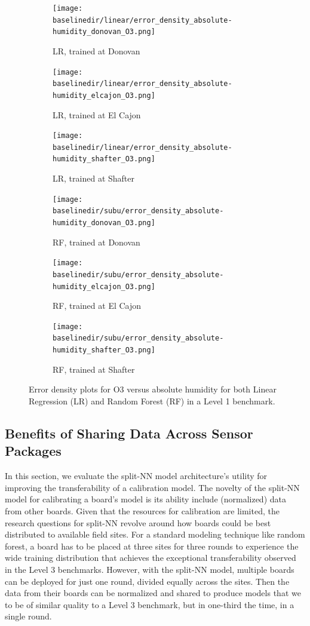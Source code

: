\documentclass[journal abbreviation, manuscript]{copernicus}
\begin{document}
\begin{figure}[H]
\centering
\begin{subfigure}{0.33\textwidth}
\texttt{[image: \\baselinedir/linear/error\_density\_absolute-humidity\_donovan\_O3.png]}
\caption{LR, trained at Donovan}
\end{subfigure}
\begin{subfigure}{0.33\textwidth}
\texttt{[image: \\baselinedir/linear/error\_density\_absolute-humidity\_elcajon\_O3.png]}
\caption{LR, trained at El Cajon}
\end{subfigure}
\begin{subfigure}{0.33\textwidth}
\texttt{[image: \\baselinedir/linear/error\_density\_absolute-humidity\_shafter\_O3.png]}
\caption{LR, trained at Shafter}
\end{subfigure}
\begin{subfigure}{0.33\textwidth}
\texttt{[image: \\baselinedir/subu/error\_density\_absolute-humidity\_donovan\_O3.png]}
\caption{RF, trained at Donovan}
\end{subfigure}
\begin{subfigure}{0.33\textwidth}
\texttt{[image: \\baselinedir/subu/error\_density\_absolute-humidity\_elcajon\_O3.png]}
\caption{RF, trained at El Cajon}
\end{subfigure}
\begin{subfigure}{0.33\textwidth}
\texttt{[image: \\baselinedir/subu/error\_density\_absolute-humidity\_shafter\_O3.png]}
\caption{RF, trained at Shafter}
\end{subfigure}
\caption{Error density plots for O3 versus absolute humidity for both Linear Regression (LR) and Random Forest (RF) in a Level 1 benchmark.}
\label{fig:error-density}
\end{figure}


\subsection{Benefits of Sharing Data Across Sensor Packages}
In this section, we evaluate the split-NN model architecture's utility for improving the transferability of a calibration model.  The novelty of the split-NN model for calibrating a board's model is its ability include (normalized) data from other boards.  Given that the resources for calibration are limited, the research questions for split-NN revolve around how boards could be best distributed to available field sites.  For a standard modeling technique like random forest, a board has to be placed at three sites for three rounds to experience the wide training distribution that achieves the exceptional transferability observed in the Level 3 benchmarks.  However, with the split-NN model, multiple boards can be deployed for just one round, divided equally across the sites.  Then the data from their boards can be normalized and shared to produce models that we to be of similar quality to a Level 3 benchmark, but in one-third the time, in a single round.
\end{document}
